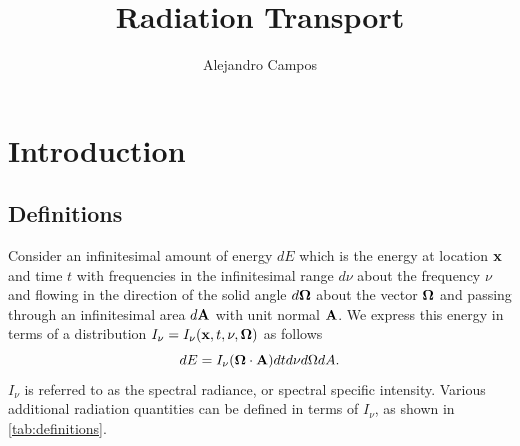 \documentclass[a4paper,11pt]{report}
\title{Radiation Transport}
\author{Alejandro Campos}
\begin{document}
\maketitle
\tableofcontents

\chapter{Introduction}

\section{Definitions}
Consider an infinitesimal amount of energy $dE$ which is the energy at location $\mathbf{x}$ and time $t$ with frequencies in the infinitesimal range $d\nu$ about the frequency $\nu$ and flowing in the direction of the solid angle $d\bm \Omega$ about the vector $\bm \Omega$ and passing through an infinitesimal area $d\mathbf{A}$ with unit normal $\mathbf{A}$. We express this energy in terms of a distribution $I_\nu = I_\nu(\mathbf{x}, t, \nu, \bm \Omega)$ as follows
\begin{equation}
    dE = I_\nu (\bm \Omega \cdot \mathbf{A}) dt d\nu d\Omega dA.
\end{equation}
$I_\nu$ is referred to as the spectral radiance, or spectral specific intensity. Various additional radiation quantities can be defined in terms of $I_\nu$, as shown in \cref{tab:definitions}.

\setlength{\cellspacetoplimit}{3pt}
\setlength{\cellspacebottomlimit}{3pt}
\end{document}
